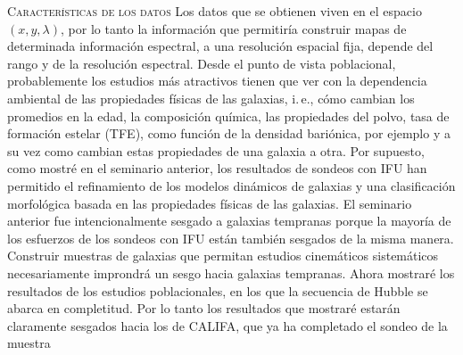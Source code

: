 \documentclass[xcolor=dvipsnames,4pt,hyperref={colorlinks,citecolor=black,linkcolor=black,urlcolor=black}]{beamer}
\begin{document}
\begin{frame}[allowframebreaks]{\textsc{Características de los datos}}
%
Los datos que se obtienen viven en el espacio $(x,y,\lambda)$, por lo tanto la información que
permitiría construir mapas de determinada información espectral, a una resolución espacial fija,
depende del rango y de la resolución espectral. Desde el punto de vista poblacional, probablemente
los estudios más atractivos tienen que ver con la dependencia ambiental de las propiedades físicas
de las galaxias, i.\,e., cómo cambian los promedios en la edad, la composición química, las
propiedades del polvo, tasa de formación estelar (TFE), como función de la densidad bariónica, por
ejemplo y a su vez como cambian estas propiedades de una galaxia a otra.
%
Por supuesto, como mostré en el seminario anterior, los resultados de sondeos con IFU han permitido
el refinamiento de los modelos dinámicos de galaxias y una clasificación morfológica basada en las
propiedades físicas de las galaxias.
%
El seminario anterior fue intencionalmente sesgado a galaxias tempranas porque la mayoría de los
esfuerzos de los sondeos con IFU están también sesgados de la misma manera. Construir muestras de
galaxias que permitan estudios cinemáticos sistemáticos necesariamente improndrá un sesgo hacia
galaxias tempranas. Ahora mostraré los resultados de los estudios poblacionales, en los que la
secuencia de Hubble se abarca en completitud. Por lo tanto los resultados que mostraré estarán
claramente sesgados hacia los de CALIFA, que ya ha completado el sondeo de la muestra
%
%
\end{frame}
\end{document}
